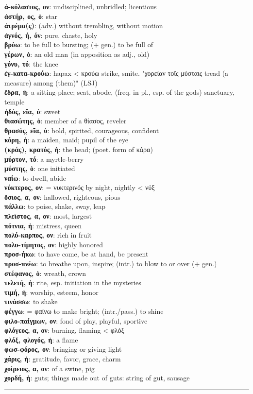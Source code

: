 \documentclass[13pt]{article}
\newcommand{\vocabentry}[2]{\textbf{#1}: #2\vspace{0.0em}\\}
\begin{document}
\begin{greek}
\newpage
\begin{multicols}{2}
\small %
\vocabentry{ἀ-κόλαστος, ον}{undisciplined, unbridled; licentious}
\vocabentry{ἀστήρ, ος, ὁ}{star}
\vocabentry{ἀτρέμα(ς)}{(adv.) without trembling, without motion}
\vocabentry{ἁγνός, ή, όν}{pure, chaste, holy}
\vocabentry{βρύω}{to be full to bursting; (+ gen.) to be full of}
\vocabentry{γέρων, ὁ}{an old man (in apposition as adj., old)}
\vocabentry{γόνυ, τό}{the knee}
\vocabentry{ἐγ-κατα-κρούω}{hapax < κρούω strike, smite. "χορείαν τοῖς μύσταις tread (a measure) among (them)" (LSJ)}
\vocabentry{ἕδρα, ἡ}{a sitting-place; seat, abode, (freq. in pl., esp. of the gods) sanctuary, temple}
\vocabentry{ἡδύς, εῖα, ύ}{sweet}
\vocabentry{θιασώτης, ὁ}{member of a θίασος, reveler}
\vocabentry{θρασύς, εῖα, ύ}{bold, spirited, courageous, confident}
\vocabentry{κόρη, ἡ}{a maiden, maid; pupil of the eye}
\vocabentry{(κράς), κρατός, ἡ}{the head; (poet. form of κάρα)}
\vocabentry{μύρτον, τό}{a myrtle-berry}
\vocabentry{μύστης, ὁ}{one initiated}
\vocabentry{ναίω}{to dwell, abide}
\vocabentry{νύκτερος, ον}{= νυκτερινός by night, nightly < νύξ}
\vocabentry{ὅσιος, α, ον}{hallowed, righteous, pious}
\vocabentry{πάλλω}{to poise, shake, sway, leap}
\vocabentry{πλεῖστος, α, ον}{most, largest}
\vocabentry{πότνια, ἡ}{mistress, queen}
\vocabentry{πολύ-καρπος, ον}{rich in fruit}
\vocabentry{πολυ-τίμητος, ον}{highly honored}
\vocabentry{προσ-ήκω}{to have come, be at hand, be present}
\vocabentry{προσ-πνέω}{to breathe upon, inspire; (intr.) to blow to or over (+ gen.)}
\vocabentry{στέφανος, ὁ}{wreath, crown}
\vocabentry{τελετή, ἡ}{rite, esp. initiation in the mysteries}
\vocabentry{τιμή, ἡ}{worship, esteem, honor}
\vocabentry{τινάσσω}{to shake}
\vocabentry{φέγγω}{= φαίνω to make bright; (intr./pass.) to shine}
\vocabentry{φιλο-παίγμων, ον}{fond of play, playful, sportive}
\vocabentry{φλόγεος, α, ον}{burning, flaming < φλόξ}
\vocabentry{φλόξ, φλογός, ἡ}{a flame}
\vocabentry{φωσ-φόρος, ον}{bringing or giving light}
\vocabentry{χάρις, ἡ}{gratitude, favor, grace, charm}
\vocabentry{χοίρειος, α, ον}{of a swine, pig}
\vocabentry{χορδή, ἡ}{guts; things made out of guts: string of gut, sausage}
\end{multicols}

\vspace{-1.5em}
\noindent\rule{\linewidth}{0.4pt}
\vspace{-2em}

\begin{multicols}{2}
\begin{parcolumns}[colwidths={1=1.5em, 2=0.9\linewidth}]{2}
\small


\end{parcolumns}
\end{multicols}
\end{greek}
\end{document}
